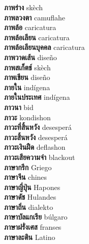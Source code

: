 \textbf{ ภาพร่าง  } skèch \\
\textbf{ ภาพลวงตา  } camuflahe \\
\textbf{ ภาพล้อ  } caricatura \\
\textbf{ ภาพล้อเลียน  } caricatura \\
\textbf{ ภาพล้อเลียนบุคคล  } caricatura \\
\textbf{ ภาพวาดเส้น  } diseño \\
\textbf{ ภาพสเก็ตช์  } skèch \\
\textbf{ ภาพเขียน  } diseño \\
\textbf{ ภายใน  } indígena \\
\textbf{ ภายในประเทศ  } indígena \\
\textbf{ ภาวนา  } bid \\
\textbf{ ภาวะ  } kondishon \\
\textbf{ ภาวะที่สิ้นหวัง  } desesperá \\
\textbf{ ภาวะสิ้นหวัง  } desesperá \\
\textbf{ ภาวะเงินฝืด  } deflashon \\
\textbf{ ภาวะเสียความจำ  } blackout \\
\textbf{ ภาษากรีก  } Griego \\
\textbf{ ภาษาจีน  } chines \\
\textbf{ ภาษาญี่ปุ่น  } Hapones \\
\textbf{ ภาษาดัช  } Hulandes \\
\textbf{ ภาษาถิ่น  } dialekto \\
\textbf{ ภาษาบัลแกเรีย  } búlgaro \\
\textbf{ ภาษาฝรั่งเศส  } franses \\
\textbf{ ภาษาละติน  } Latino \\
